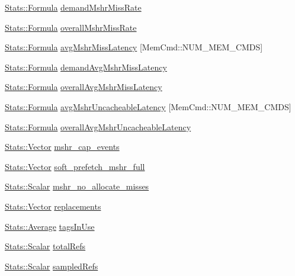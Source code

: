 \begin{DoxyCompactItemize}
\item 
\hyperlink{classStats_1_1Formula}{Stats::Formula} \hyperlink{group__CacheStatistics_gab2368c54094c318b31b50fd594422e7d}{demandMshrMissRate}
\item 
\hyperlink{classStats_1_1Formula}{Stats::Formula} \hyperlink{group__CacheStatistics_ga041b1609c62fdc738bc7f66172ee5c7d}{overallMshrMissRate}
\item 
\hyperlink{classStats_1_1Formula}{Stats::Formula} \hyperlink{group__CacheStatistics_gabab885accb53d71c843ad12bc0a928e7}{avgMshrMissLatency} \mbox{[}MemCmd::NUM\_\-MEM\_\-CMDS\mbox{]}
\item 
\hyperlink{classStats_1_1Formula}{Stats::Formula} \hyperlink{group__CacheStatistics_ga0fba53068815c749879bd3ec5aed871f}{demandAvgMshrMissLatency}
\item 
\hyperlink{classStats_1_1Formula}{Stats::Formula} \hyperlink{group__CacheStatistics_gabb74e2451414ec42c24792cdea6a6060}{overallAvgMshrMissLatency}
\item 
\hyperlink{classStats_1_1Formula}{Stats::Formula} \hyperlink{group__CacheStatistics_gaf6ebe7e4d284c4f93fd2ec80828e0e82}{avgMshrUncacheableLatency} \mbox{[}MemCmd::NUM\_\-MEM\_\-CMDS\mbox{]}
\item 
\hyperlink{classStats_1_1Formula}{Stats::Formula} \hyperlink{group__CacheStatistics_gaabd47c5862f5963ede65d408a3776412}{overallAvgMshrUncacheableLatency}
\item 
\hyperlink{classStats_1_1Vector}{Stats::Vector} \hyperlink{group__CacheStatistics_gab4ea8c6f8941356804bb9de4885a7ff4}{mshr\_\-cap\_\-events}
\item 
\hyperlink{classStats_1_1Vector}{Stats::Vector} \hyperlink{group__CacheStatistics_ga673f963f100608daf064537a4dde7ec7}{soft\_\-prefetch\_\-mshr\_\-full}
\item 
\hyperlink{classStats_1_1Scalar}{Stats::Scalar} \hyperlink{group__CacheStatistics_ga031ceb1999386dd8e6f8e9355942d9eb}{mshr\_\-no\_\-allocate\_\-misses}
\item 
\hyperlink{classStats_1_1Vector}{Stats::Vector} \hyperlink{group__CacheStatistics_gabe49d967160cb4f2808c2374eada5cbd}{replacements}
\item 
\hyperlink{classStats_1_1Average}{Stats::Average} \hyperlink{group__CacheStatistics_gac47f8631e7a5c6ca2d7bdc4a3385ef5c}{tagsInUse}
\item 
\hyperlink{classStats_1_1Scalar}{Stats::Scalar} \hyperlink{group__CacheStatistics_gaafe04ce7df5e42da3c45e3991561520e}{totalRefs}
\item 
\hyperlink{classStats_1_1Scalar}{Stats::Scalar} \hyperlink{group__CacheStatistics_ga0b8c102a0e9d83ec69d9ac7ee25b378b}{sampledRefs}

\end{DoxyCompactItemize}
